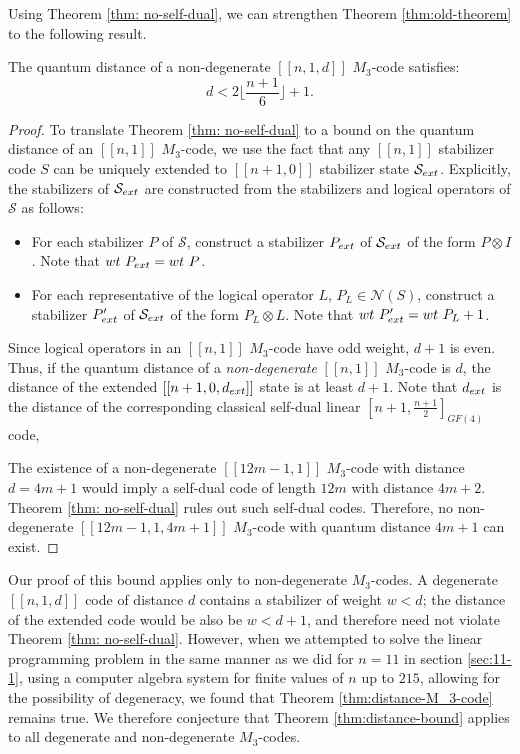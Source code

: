 \documentclass[11pt]{article}
\newcommand{\wt}{{\rm{wt}} }
\begin{document}
Using Theorem \ref{thm: no-self-dual}, we can strengthen Theorem \ref{thm:old-theorem} to the following result.
\begin{theorem}
\label{thm:distance-bound}
The quantum distance of a non-degenerate $[[n,1,d]]$ $M_3$-code satisfies:
\begin{equation}
    d < 2 \lfloor \frac{n+1}{6} \rfloor + 1.
\end{equation} \label{thm:distance-M_3-code}
\end{theorem}
\begin{proof}
To translate Theorem \ref{thm: no-self-dual} to a bound on the quantum distance of an $[[n,1]]$ $M_3$-code, we use the fact that any $[[n,1]]$ stabilizer code $S$  can be uniquely extended to $[[n+1,0]]$ stabilizer state $\mathcal S_{\rm ext}$. Explicitly, the stabilizers of $\mathcal S_{\rm ext}$ are constructed from the stabilizers and logical operators of $\mathcal S$ as follows: 
\begin{itemize}
    \item For each stabilizer $P$ of $\mathcal S$, construct a stabilizer $P_{\rm ext}$ of $\mathcal S_{\rm ext}$ of the form $P \otimes I$. Note that $\wt~ P_{\rm ext}=\wt ~ P$.
    \item For each representative of the logical operator $L$, $P_L \in \mathcal N(S)$, construct a stabilizer $P_{\rm ext}'$ of $\mathcal S_{\rm ext}$ of the form $P_L \otimes L$. Note that $\wt~P_{\rm ext}'=\wt~ P_L+1$.
\end{itemize}
Since logical operators in an $[[n,1]]$ $M_3$-code have odd weight, $d+1$ is even. Thus, if the quantum distance of a \textit{non-degenerate} $[[n,1]]$ $M_3$-code is $d$, the distance of the extended $[[n+1,0,d_{\rm ext}]]$ state is at least $d+1$. Note that $d_{\rm ext}$ is the distance of the corresponding classical self-dual linear $[n+1,\frac{n+1}{2}]_{GF(4)}$ code, 


The existence of a non-degenerate $[[12m-1,1]]$ $M_3$-code with distance $d= 4m+1$ would imply a self-dual code of length $12m$ with distance $4m+2$.
Theorem \ref{thm: no-self-dual} rules out such self-dual codes.
Therefore, no non-degenerate $[[12m-1, 1,4m+1]]$ $M_3$-code with quantum distance $4m+1$ can exist.
\end{proof}
Our proof of this bound applies only to non-degenerate $M_3$-codes. A degenerate $[[n,1,d]]$ code of distance $d$ contains a stabilizer of weight $w<d$; the distance of the extended code would be also be $w<d+1$, and therefore need not violate Theorem \ref{thm: no-self-dual}.  However, when we attempted to solve the linear programming problem in the same manner as we did for $n=11$ in section \ref{sec:11-1}, using a computer algebra system for finite values of $n$ up to $215$, allowing for the possibility of degeneracy, we found that Theorem \ref{thm:distance-M_3-code} remains true. We therefore conjecture that Theorem \ref{thm:distance-bound} applies to all degenerate and non-degenerate $M_3$-codes.
\end{document}
